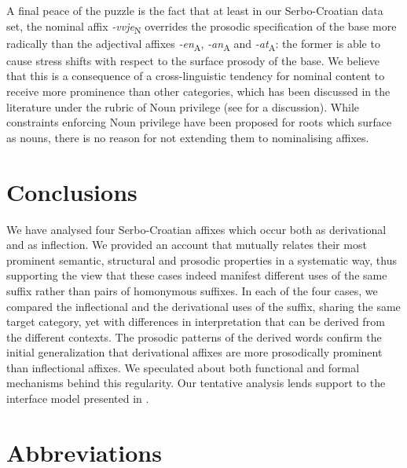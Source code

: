 \documentclass[output=paper]{langsci/langscibook}
\begin{document}
A final peace of the puzzle is the fact that at least in our Serbo-Croatian data set, the nominal affix\textit{ -vvje}\textsubscript{N} overrides the prosodic specification of the base more radically than the adjectival affixes \textit{-en}\textsubscript{A}, \textit{-an}\textsubscript{A} and \textit{-at}\textsubscript{A}: the former is able to cause stress shifts with respect to the surface prosody of the base. We believe that this is a consequence of a cross-linguistic tendency for nominal content to receive more prominence than other categories, which has been discussed in the literature under the rubric of Noun privilege (see \citealt{Smi2011} for a discussion). While constraints enforcing Noun privilege have been proposed for roots which surface as nouns, there is no reason for not extending them to nominalising affixes.
\section{Conclusions}\label{sec:simonovic:7}
We have analysed four Serbo-Croatian affixes which occur both as derivational and as inflection. We provided an account that mutually relates their most prominent semantic, structural and prosodic properties in a systematic way, thus supporting the view that these cases indeed manifest different uses of the same suffix rather than pairs of homonymous suffixes. In each of the four cases, we compared the inflectional and the derivational uses of the suffix, sharing the same target category, yet with differences in interpretation that can be derived from the different contexts.
The prosodic patterns of the derived words confirm the initial generalization that derivational affixes are more prosodically prominent than inflectional affixes. We speculated about both functional and formal mechanisms behind this regularity. Our tentative analysis lends support to the interface model presented in \cite{Revithiadou1999}. 


\section*{Abbreviations}
\end{document}
